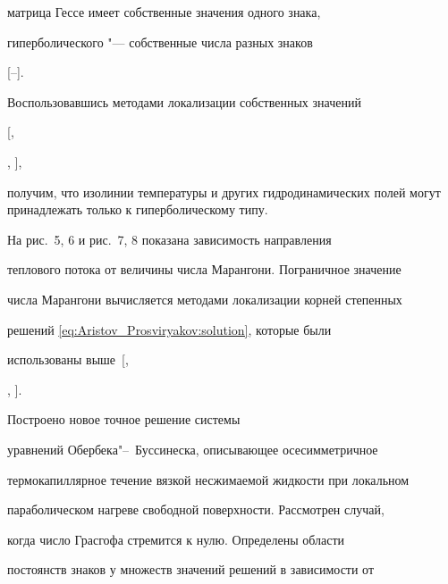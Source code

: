 матрица Гессе имеет собственные значения одного знака,

гиперболического "--- собственные числа разных знаков

[--].

Воспользовавшись методами локализации собственных значений

[,

, ],

получим, что изолинии температуры  и других гидродинамических полей могут принадлежать только к гиперболическому типу.









\pagebreak



На рис.~5, 6 и рис.~7, 8 показана зависимость направления

теплового потока от величины числа Марангони. Пограничное значение

числа Марангони вычисляется методами локализации корней степенных

решений  \eqref{eq:Aristov_Prosviryakov:solution}, которые были

использованы выше~[,

, ].



\smallskip



 Построено новое точное решение системы

уравнений  Обербека"--~Буссинеска, описывающее осесимметричное

термокапиллярное течение вязкой несжимаемой жидкости при локальном

параболическом нагреве свободной поверхности. Рассмотрен случай,

когда число Грасгофа стремится к нулю. Определены области

постоянств знаков у множеств значений решений в зависимости от

